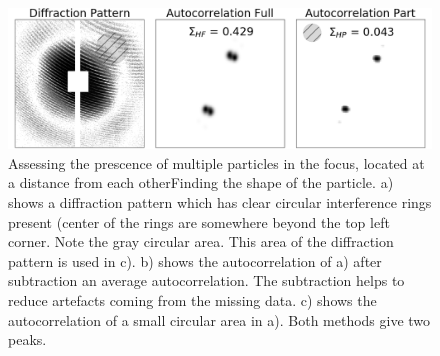\begin{figure}[h]
\centering
\includegraphics[width=120mm]{Chapter_08_ImageClassification_Multiple_Finding.png}
\caption{Assessing the prescence of multiple particles in the focus, located at a distance from each otherFinding the shape of the particle. a) shows a diffraction pattern which has clear circular interference rings present (center of the rings are somewhere beyond the top left corner. Note the gray circular area. This area of the diffraction pattern is used in c). b) shows the autocorrelation of a) after subtraction an average autocorrelation. The subtraction helps to reduce artefacts coming from the missing data. c) shows the autocorrelation of a small circular area in a). Both methods give two peaks.  }\label{fig:detailed_shape_assessment}
\end{figure}